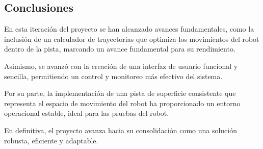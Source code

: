 \subsection{Conclusiones}

En esta iteración del proyecto se han alcanzado avances fundamentales, como la inclusión de un calculador de trayectorias que optimiza los movimientos del robot dentro de la pista, marcando un avance fundamental para su rendimiento.

Asimismo, se avanzó con la creación de una interfaz de usuario funcional y sencilla, permitiendo un control y monitoreo más efectivo del sistema. 

Por su parte, la implementación de una pista de superficie consistente que representa el espacio de movimiento del robot ha proporcionado un entorno operacional estable, ideal para las pruebas del robot.

En definitiva, el proyecto avanza hacia su consolidación como una solución robusta, eficiente y adaptable.